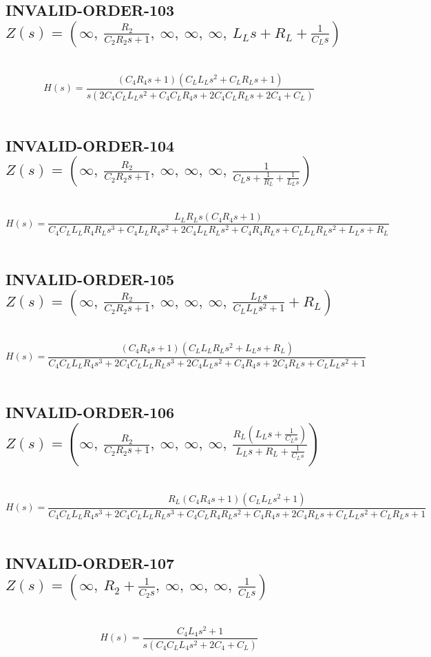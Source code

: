 \documentclass{article}
\begin{document}
\subsection{INVALID-ORDER-103 $Z(s) = \left( \infty, \  \frac{R_{2}}{C_{2} R_{2} s + 1}, \  \infty, \  \infty, \  \infty, \  L_{L} s + R_{L} + \frac{1}{C_{L} s}\right)$ } \ 
\textbf{\[H(s) = \frac{\left(C_{4} R_{4} s + 1\right) \left(C_{L} L_{L} s^{2} + C_{L} R_{L} s + 1\right)}{s \left(2 C_{4} C_{L} L_{L} s^{2} + C_{4} C_{L} R_{4} s + 2 C_{4} C_{L} R_{L} s + 2 C_{4} + C_{L}\right)}\] } \ 
\subsection{INVALID-ORDER-104 $Z(s) = \left( \infty, \  \frac{R_{2}}{C_{2} R_{2} s + 1}, \  \infty, \  \infty, \  \infty, \  \frac{1}{C_{L} s + \frac{1}{R_{L}} + \frac{1}{L_{L} s}}\right)$ } \ 
\textbf{\[H(s) = \frac{L_{L} R_{L} s \left(C_{4} R_{4} s + 1\right)}{C_{4} C_{L} L_{L} R_{4} R_{L} s^{3} + C_{4} L_{L} R_{4} s^{2} + 2 C_{4} L_{L} R_{L} s^{2} + C_{4} R_{4} R_{L} s + C_{L} L_{L} R_{L} s^{2} + L_{L} s + R_{L}}\] } \ 
\subsection{INVALID-ORDER-105 $Z(s) = \left( \infty, \  \frac{R_{2}}{C_{2} R_{2} s + 1}, \  \infty, \  \infty, \  \infty, \  \frac{L_{L} s}{C_{L} L_{L} s^{2} + 1} + R_{L}\right)$ } \ 
\textbf{\[H(s) = \frac{\left(C_{4} R_{4} s + 1\right) \left(C_{L} L_{L} R_{L} s^{2} + L_{L} s + R_{L}\right)}{C_{4} C_{L} L_{L} R_{4} s^{3} + 2 C_{4} C_{L} L_{L} R_{L} s^{3} + 2 C_{4} L_{L} s^{2} + C_{4} R_{4} s + 2 C_{4} R_{L} s + C_{L} L_{L} s^{2} + 1}\] } \ 
\subsection{INVALID-ORDER-106 $Z(s) = \left( \infty, \  \frac{R_{2}}{C_{2} R_{2} s + 1}, \  \infty, \  \infty, \  \infty, \  \frac{R_{L} \left(L_{L} s + \frac{1}{C_{L} s}\right)}{L_{L} s + R_{L} + \frac{1}{C_{L} s}}\right)$ } \ 
\textbf{\[H(s) = \frac{R_{L} \left(C_{4} R_{4} s + 1\right) \left(C_{L} L_{L} s^{2} + 1\right)}{C_{4} C_{L} L_{L} R_{4} s^{3} + 2 C_{4} C_{L} L_{L} R_{L} s^{3} + C_{4} C_{L} R_{4} R_{L} s^{2} + C_{4} R_{4} s + 2 C_{4} R_{L} s + C_{L} L_{L} s^{2} + C_{L} R_{L} s + 1}\] } \ 
\subsection{INVALID-ORDER-107 $Z(s) = \left( \infty, \  R_{2} + \frac{1}{C_{2} s}, \  \infty, \  \infty, \  \infty, \  \frac{1}{C_{L} s}\right)$ } \ 
\textbf{\[H(s) = \frac{C_{4} L_{4} s^{2} + 1}{s \left(C_{4} C_{L} L_{4} s^{2} + 2 C_{4} + C_{L}\right)}\] } \ 
\end{document}
